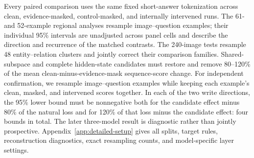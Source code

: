Every paired comparison uses the same fixed short-answer tokenization across clean, evidence-masked, control-masked, and internally intervened runs. The 61- and 52-example regional analyses resample image--question examples; their individual 95\% intervals are unadjusted across panel cells and describe the direction and recurrence of the matched contrasts. The 240-image tests resample 48 entity--relation clusters and jointly correct their comparison families. Shared-subspace and complete hidden-state candidates must restore and remove 80--120\% of the mean clean-minus-evidence-mask sequence-score change. For independent confirmation, we resample image--question examples while keeping each example's clean, masked, and intervened scores together. In each of the two write directions, the 95\% lower bound must be nonnegative both for the candidate effect minus 80\% of the natural loss and for 120\% of that loss minus the candidate effect: four bounds in total. The later three-model result is diagnostic rather than jointly prospective. Appendix~\ref{app:detailed-setup} gives all splits, target rules, reconstruction diagnostics, exact resampling counts, and model-specific layer settings.
